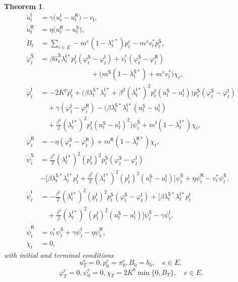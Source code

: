 \documentclass[letterpaper, 10 pt, conference]{ieeeconf}  %
\def\sS{\mathsf{S}}
\def\sI{\mathsf{I}}
\def\sR{\mathsf{R}}
\newtheorem{theorem}{Theorem}[section]
\begin{document}
\begin{theorem}
\begin{align}
\dot u_t^\sI&=\gamma\big(u_t^\sI-u_t^\sR\big)-c_{\sI},\nonumber\\
\dot u_t^\sR&=\eta\big(u_t^\sR-u_t^\sS\big),\nonumber\\
\dot B_t &= \sum_{e\in E} - m^e(1 - \lambda_t^{e*}) p_t^e
- m^{v}v^{*}_{t} p_t^\sS, \nonumber\\
\dot{\varphi}_t^\sS&=\beta\hat{\alpha}_t^\sS \lambda_t^{\sI*} p_t^\sI (\varphi_t^\sS - \varphi_t^\sI)+v_t^*(\varphi_t^\sS - \varphi_t^\sR)\nonumber\\&\hspace{3cm}+\big(m^\sS(1-\lambda_t^{\sS*})+ m^v v_t^*\big)\chi_t, \nonumber\\
\dot{\varphi}_t^\sI&=-2 K^p p_t^\sI+\Big(\beta \lambda_t^{\sS*} \lambda_t^{\sI*}+\beta^2(\lambda_t^{\sI*})^2 p_t^\sI (u_t^\sS-u_t^\sI)\Big) p_t^\sS (\varphi_t^\sS-\varphi_t^\sI)\nonumber\\&\quad+\gamma(\varphi_t^\sI-\varphi_t^\sR)
-\Big(\beta \lambda_t^{\sS*} \lambda_t^{\sI*} (u_t^\sS-u_t^\sI) \nonumber\\ &\quad +\frac{\beta^2}{2}(\lambda_t^{\sI*})^2 p_t^\sI(u_t^\sS-u_t^\sI)^2\Big)\psi_t^\sS+ m^\sI (1-\lambda_t^{\sI*})\chi_t, \nonumber\\
\dot{\varphi}_t^\sR&=-\eta(\varphi_t^\sS-\varphi_t^\sR)+ m^\sR(1-\lambda_t^{\sR*})\chi_t,\nonumber \\
\dot{\psi}_t^\sS&=\frac{\beta^2}{2}(\lambda_t^{\sI*})^2 (p_t^\sI)^2 p_t^\sS (\varphi_t^\sS-\varphi_t^\sI)\nonumber \\ &-\Big[\beta \lambda_t^{\sS*} \lambda_t^{\sI*} p_t^\sI+\frac{\beta^2}{2}(\lambda_t^{\sI*})^2 (p_t^\sI)^2 (u_t^\sS-u_t^\sI)\Big] \psi_t^\sS+\eta \psi_t^\sR - v^*_t \psi_t^\sS,\nonumber \\
\dot{\psi}_t^\sI&=-\frac{\beta^2}{2}(\lambda_t^{\sI*})^2 (p_t^\sI)^2 p_t^\sS(\varphi_t^\sS-\varphi_t^\sI)+\Big[\beta \lambda_t^{\sS*} \lambda_t^{\sI*} p_t^\sI\nonumber\\&\quad+\frac{\beta^2}{2}(\lambda_t^{\sI*})^2 (p_t^\sI)^2 (u_t^\sS-u_t^\sI)\Big] \psi_t^\sS-\gamma \psi_t^\sI,\nonumber \\
\dot{\psi}_t^\sR&=v^*_t \psi_t^\sS+\gamma \psi_t^\sI -\eta \psi_t^\sR,\nonumber \\
\dot{\chi}_t&=0,\label{eq:smfe_fbode}
\end{align}
\normalsize
with initial and terminal conditions
\small
$$u^e_T = 0, p^e_0 = \pi_0^e, B_0 = b_0, \quad e \in E,$$
$$\varphi^e_T = 0, \psi^e_0 = 0,\chi_T = 2K^b \min\{0,B_T\}, \quad e \in E.$$
\normalsize
\end{theorem}
\end{document}
